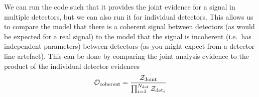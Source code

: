 We can run the code such that it provides the joint evidence for a signal in multiple detectors, but we can
also run it for individual detectors. This allows us to compare the model that there is a coherent signal
between detectors (as would be expected for a real signal) to the model that the signal is incoherent (i.e.\ has independent parameters)
between detectors (as you might expect from a detector line artefact). This can be done by comparing the joint
analysis evidence to the product of the individual detector evidences
\begin{equation}
\mathcal{O}_{\rm coherent} = \frac{\mathcal{Z}_{\rm Joint}}{\prod_{i=1}^{N_{\rm det}} \mathcal{Z}_{{\rm det}_i}}
\end{equation}

  
  